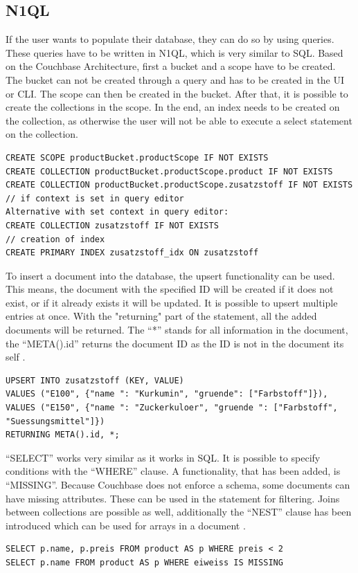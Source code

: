 \subsection{\ac{N1QL}}
If the user wants to populate their database, they can do so by using queries. These queries have to be written in \ac{N1QL}, which is very similar to \ac{SQL}. Based on the Couchbase Architecture, first a bucket and a scope have to be created. The bucket can not be created through a query and has to be created in the \ac{UI} or \ac{CLI}. The scope can then be created in the bucket. After that, it is possible to create the collections in the scope. In the end, an index needs to be created on the collection, as otherwise the user will not be able to execute a select statement on the collection.

\begin{lstlisting}
CREATE SCOPE productBucket.productScope IF NOT EXISTS
CREATE COLLECTION productBucket.productScope.product IF NOT EXISTS
CREATE COLLECTION productBucket.productScope.zusatzstoff IF NOT EXISTS
// if context is set in query editor
Alternative with set context in query editor: 
CREATE COLLECTION zusatzstoff IF NOT EXISTS
// creation of index
CREATE PRIMARY INDEX zusatzstoff_idx ON zusatzstoff
\end{lstlisting}

To insert a document into the database, the upsert functionality can be used. This means, the document with the specified ID will be created if it does not exist, or if it already exists it will be updated. It is possible to upsert multiple entries at once. With the "returning" part of the statement, all the added documents will be returned. The ``*'' stands for all information in the document, the ``META().id'' returns the document ID as the ID is not in the document its self \parencite{Couchbase.20230314}.
\begin{lstlisting}
UPSERT INTO zusatzstoff (KEY, VALUE)
VALUES ("E100", {"name ": "Kurkumin", "gruende": ["Farbstoff"]}),
VALUES ("E150", {"name ": "Zuckerkuloer", "gruende ": ["Farbstoff", "Suessungsmittel"]})
RETURNING META().id, *;
\end{lstlisting}

``SELECT'' works very similar as it works in \ac{SQL}. It is possible to specify conditions with the ``WHERE'' clause. A functionality, that has been added, is ``MISSING''. Because Couchbase does not enforce a schema, some documents can have missing attributes. These can be used in the statement for filtering. Joins between collections are possible as well, additionally the ``NEST'' clause has been introduced which can be used for arrays in a document \parencite{Couchbase.20230314b}.
\begin{lstlisting}
SELECT p.name, p.preis FROM product AS p WHERE preis < 2
SELECT p.name FROM product AS p WHERE eiweiss IS MISSING
\end{lstlisting}

